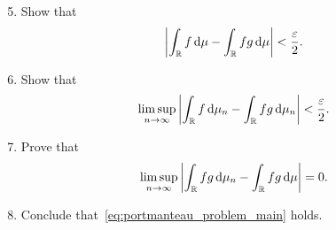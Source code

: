 \begin{problem}
\begin{enumerate}[label={(\alph*)}]
\setcounter{enumi}{4}
\item Show that
\[
	\left|\int_{\mathbb R} f \, \mathrm{d} \mu - \int_{\mathbb R} fg \, \mathrm{d} \mu\right| < \frac{\varepsilon}{2}.
\]
\item Show that
\[
	\limsup_{n \to \infty} \left|\int_{\mathbb R} f \, \mathrm{d} \mu_n - \int_{\mathbb R} fg \, \mathrm{d} \mu_n\right| < \frac{\varepsilon}{2}.
\]
\item Prove that 
\[
	\limsup_{n \to \infty} \left|\int_{\mathbb R} fg \, \mathrm{d} \mu_n - \int_{\mathbb R} fg \, \mathrm{d} \mu\right| = 0.
\]
\item Conclude that~\eqref{eq:portmanteau_problem_main} holds.
\end{enumerate}

%
\end{problem}

